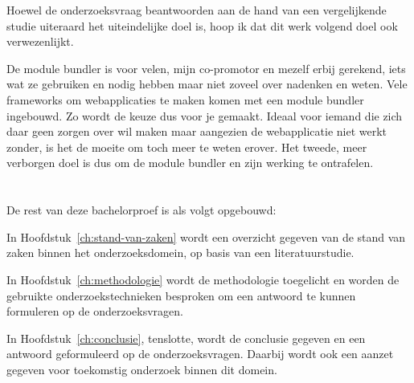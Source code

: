 Hoewel de onderzoeksvraag beantwoorden aan de hand van een vergelijkende studie uiteraard het uiteindelijke doel is, hoop ik dat dit werk volgend doel ook verwezenlijkt.

De module bundler is voor velen, mijn co-promotor en mezelf erbij gerekend, iets wat ze gebruiken en nodig hebben maar niet zoveel over nadenken en weten. Vele frameworks om webapplicaties te maken komen met een module bundler ingebouwd. Zo wordt de keuze dus voor je gemaakt. Ideaal voor iemand die zich daar geen zorgen over wil maken maar aangezien de webapplicatie niet werkt zonder, is het de moeite om toch meer te weten erover. Het tweede, meer verborgen doel is dus om de module bundler en zijn werking te ontrafelen. 

\section{}
\label{sec:opzet-bachelorproef}


De rest van deze bachelorproef is als volgt opgebouwd:

In Hoofdstuk~\ref{ch:stand-van-zaken} wordt een overzicht gegeven van de stand van zaken binnen het onderzoeksdomein, op basis van een literatuurstudie.

In Hoofdstuk~\ref{ch:methodologie} wordt de methodologie toegelicht en worden de gebruikte onderzoekstechnieken besproken om een antwoord te kunnen formuleren op de onderzoeksvragen.


In Hoofdstuk~\ref{ch:conclusie}, tenslotte, wordt de conclusie gegeven en een antwoord geformuleerd op de onderzoeksvragen. Daarbij wordt ook een aanzet gegeven voor toekomstig onderzoek binnen dit domein.
